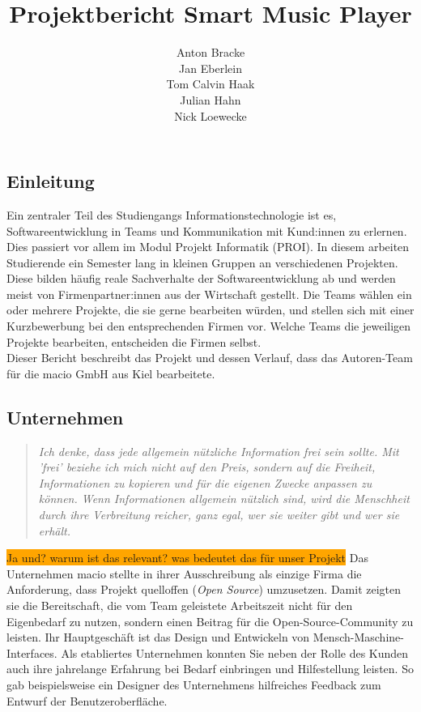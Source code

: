 \documentclass[10pt, a4paper]{article}
\title{Projektbericht Smart Music Player}
\author{Anton Bracke\\Jan Eberlein\\Tom Calvin Haak\\Julian Hahn\\Nick Loewecke}
\begin{document}
\begin{onehalfspace}
\maketitle
\newpage
\tableofcontents
\newpage




\section{Einleitung}
Ein zentraler Teil des Studiengangs \glqq Informationstechnologie\grqq{} ist es, Softwareentwicklung in Teams und Kommunikation mit Kund:innen zu erlernen. \cite{Qualifikationsziele_Informationstechnologie}
Dies passiert vor allem im Modul \glqq Projekt Informatik (PROI)\grqq{}.
In diesem arbeiten Studierende ein Semester lang in kleinen Gruppen an verschiedenen Projekten.
Diese bilden häufig reale Sachverhalte der Softwareentwicklung ab und werden meist von Firmenpartner:innen aus der Wirtschaft gestellt.
Die Teams wählen ein oder mehrere Projekte, die sie gerne bearbeiten würden, und stellen sich mit einer Kurzbewerbung bei den entsprechenden Firmen vor.
Welche Teams die jeweiligen Projekte bearbeiten, entscheiden die Firmen selbst.
\\
Dieser Bericht beschreibt das Projekt und dessen Verlauf, dass das Autoren-Team für die macio GmbH aus Kiel bearbeitete.

\subsection{Unternehmen}
\begin{quote}
  \textit{Ich denke, dass jede allgemein nützliche Information frei sein sollte.
  Mit 'frei' beziehe ich mich nicht auf den Preis, sondern auf die Freiheit, Informationen zu kopieren und für die eigenen Zwecke anpassen zu können.
  Wenn Informationen allgemein nützlich sind, wird die Menschheit durch ihre Verbreitung reicher, ganz egal, wer sie weiter gibt und wer sie erhält.}
  \cite{openSource}
\end{quote}

\colorbox{orange}{Ja und? warum ist das relevant? was bedeutet das für unser Projekt}
Das Unternehmen macio stellte in ihrer Ausschreibung als einzige Firma die Anforderung, dass Projekt quelloffen (\textit{Open Source}) umzusetzen.
Damit zeigten sie die Bereitschaft, die vom Team geleistete Arbeitszeit nicht für den Eigenbedarf zu nutzen, sondern einen Beitrag für die Open-Source-Community zu leisten.
Ihr Hauptgeschäft ist das Design und Entwickeln von Mensch-Maschine-Interfaces.
Als etabliertes Unternehmen konnten Sie neben der Rolle des Kunden auch ihre jahrelange Erfahrung bei Bedarf einbringen und Hilfestellung leisten.
So gab beispielsweise ein Designer des Unternehmens hilfreiches Feedback zum Entwurf der Benutzeroberfläche.

\end{onehalfspace}
\end{document}
